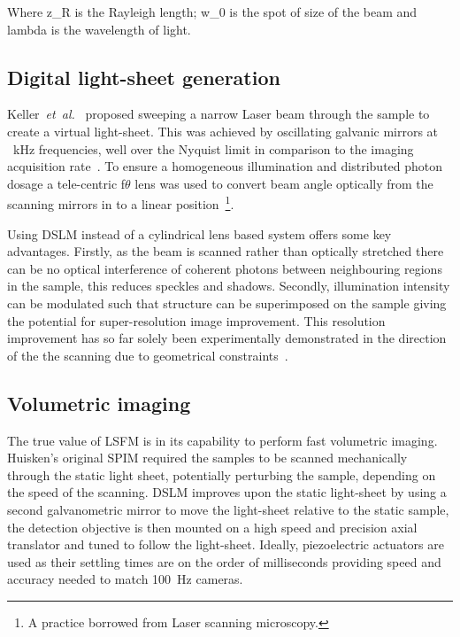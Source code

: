 Where \gls{z_R} is the \gls{Rayleigh length}; \gls{w_0} is the spot of size of the beam and \gls{lambda} is the wavelength of light.


\subsection{Digital \gls{light-sheet} generation}

Keller~\emph{et~al.}~\cite{keller_quantitative_2008} proposed sweeping a narrow \gls{Laser} beam through the sample to create a \gls{virtual light-sheet}.
This was achieved by oscillating galvanic mirrors at \SI{}{\kilo\hertz} frequencies, well over the Nyquist limit in comparison to the imaging acquisition rate~\cite{keller_quantitative_2008}.
To ensure a homogeneous illumination and distributed photon dosage a \gls{tele-centric} f$\theta$ lens was used to convert beam angle optically from the scanning mirrors in to a linear position~\footnote{A practice borrowed from \gls{Laser} scanning microscopy.}.

Using \gls{DSLM} instead of a cylindrical lens based system offers some key advantages.
Firstly, as the beam is scanned rather than optically stretched there can be no optical interference of coherent photons between neighbouring regions in the sample, this reduces speckles and shadows.
Secondly, illumination intensity can be modulated such that structure can be superimposed on the sample giving the potential for \gls{super-resolution} image improvement.
This resolution improvement has so far solely been experimentally demonstrated in the direction of the the scanning due to geometrical constraints~\cite{chen_lattice_2014}.

\subsection{Volumetric imaging}

The true value of \gls{LSFM} is in its capability to perform fast volumetric imaging.
Huisken's original \gls{SPIM} required the samples to be scanned mechanically through the static light sheet, potentially perturbing the sample, depending on the speed of the scanning.
\gls{DSLM} improves upon the static \gls{light-sheet} by using a second galvanometric mirror to move the \gls{light-sheet} relative to the static sample, the detection objective is then mounted on a high speed and precision axial translator and tuned to follow the \gls{light-sheet}.
Ideally, piezoelectric actuators are used as their settling times are on the order of milliseconds providing speed and accuracy needed to match \SI{100}{\hertz} cameras.

